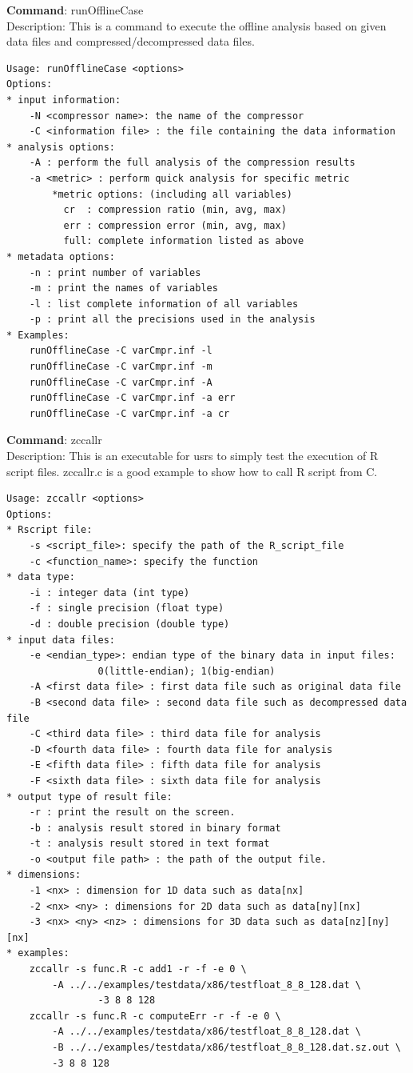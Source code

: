 \textbf{Command}: runOfflineCase\\
Description: This is a command to execute the offline analysis based on given data files and compressed/decompressed data files.
\begin{lstlisting}[style=ShellStyleInline, basicstyle = \footnotesize\ttfamily]
Usage: runOfflineCase <options>
Options:
* input information:
    -N <compressor name>: the name of the compressor
    -C <information file> : the file containing the data information
* analysis options:
    -A : perform the full analysis of the compression results
    -a <metric> : perform quick analysis for specific metric
        *metric options: (including all variables)
          cr  : compression ratio (min, avg, max)
          err : compression error (min, avg, max)
          full: complete information listed as above
* metadata options:
    -n : print number of variables
    -m : print the names of variables
    -l : list complete information of all variables
    -p : print all the precisions used in the analysis
* Examples:
    runOfflineCase -C varCmpr.inf -l
    runOfflineCase -C varCmpr.inf -m
    runOfflineCase -C varCmpr.inf -A
    runOfflineCase -C varCmpr.inf -a err
    runOfflineCase -C varCmpr.inf -a cr
\end{lstlisting}

\textbf{Command}: zccallr\\
Description: This is an executable for usrs to simply test the execution of R script files. zccallr.c is a good example to show how to call R script from C.
\begin{lstlisting}[style=ShellStyleInline, basicstyle = \footnotesize\ttfamily]
Usage: zccallr <options>
Options:
* Rscript file:
	-s <script_file>: specify the path of the R_script_file
	-c <function_name>: specify the function
* data type:
	-i : integer data (int type)
	-f : single precision (float type)
	-d : double precision (double type)
* input data files:
	-e <endian_type>: endian type of the binary data in input files:
				0(little-endian); 1(big-endian)
	-A <first data file> : first data file such as original data file
	-B <second data file> : second data file such as decompressed data file
	-C <third data file> : third data file for analysis
	-D <fourth data file> : fourth data file for analysis
	-E <fifth data file> : fifth data file for analysis
	-F <sixth data file> : sixth data file for analysis
* output type of result file:
	-r : print the result on the screen.
	-b : analysis result stored in binary format
	-t : analysis result stored in text format
	-o <output file path> : the path of the output file.
* dimensions:
	-1 <nx> : dimension for 1D data such as data[nx]
	-2 <nx> <ny> : dimensions for 2D data such as data[ny][nx]
	-3 <nx> <ny> <nz> : dimensions for 3D data such as data[nz][ny][nx]
* examples:
	zccallr -s func.R -c add1 -r -f -e 0 \
		-A ../../examples/testdata/x86/testfloat_8_8_128.dat \
				-3 8 8 128
	zccallr -s func.R -c computeErr -r -f -e 0 \
		-A ../../examples/testdata/x86/testfloat_8_8_128.dat \
		-B ../../examples/testdata/x86/testfloat_8_8_128.dat.sz.out \
		-3 8 8 128
\end{lstlisting}


